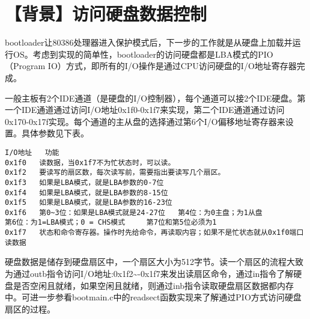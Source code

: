 \section{【背景】访问硬盘数据控制}\label{ux80ccux666fux8bbfux95eeux786cux76d8ux6570ux636eux63a7ux5236}

bootloader让80386处理器进入保护模式后，下一步的工作就是从硬盘上加载并运行OS。考虑到实现的简单性，bootloader的访问硬盘都是LBA模式的PIO（Program
IO）方式，即所有的I/O操作是通过CPU访问硬盘的I/O地址寄存器完成。

一般主板有2个IDE通道（是硬盘的I/O控制器），每个通道可以接2个IDE硬盘。第一个IDE通道通过访问I/O地址0x1f0-0x1f7来实现，第二个IDE通道通过访问0x170-0x17f实现。每个通道的主从盘的选择通过第6个I/O偏移地址寄存器来设置。具体参数见下表。

\begin{lstlisting}
I/O地址   功能
0x1f0   读数据，当0x1f7不为忙状态时，可以读。
0x1f2   要读写的扇区数，每次读写前，需要指出要读写几个扇区。
0x1f3   如果是LBA模式，就是LBA参数的0-7位
0x1f4   如果是LBA模式，就是LBA参数的8-15位
0x1f5   如果是LBA模式，就是LBA参数的16-23位
0x1f6   第0~3位：如果是LBA模式就是24-27位   第4位：为0主盘；为1从盘
第6位：为1=LBA模式；0 = CHS模式     第7位和第5位必须为1
0x1f7   状态和命令寄存器。操作时先给命令，再读取内容；如果不是忙状态就从0x1f0端口读数据
\end{lstlisting}

硬盘数据是储存到硬盘扇区中，一个扇区大小为512字节。读一个扇区的流程大致为通过outb指令访问I/O地址:0x1f2\textasciitilde{}-0x1f7来发出读扇区命令，通过in指令了解硬盘是否空闲且就绪，如果空闲且就绪，则通过inb指令读取硬盘扇区数据都内存中。可进一步参看bootmain.c中的readsect函数实现来了解通过PIO方式访问硬盘扇区的过程。
